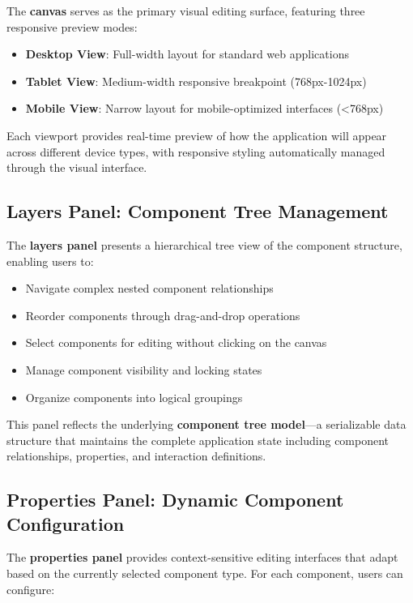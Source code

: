 \documentclass[oneside,11pt]{book}
\begin{document}
The \textbf{canvas} serves as the primary visual editing surface, featuring three responsive preview modes:

\begin{itemize}
    \item \textbf{Desktop View}: Full-width layout for standard web applications
    \item \textbf{Tablet View}: Medium-width responsive breakpoint (768px-1024px)
    \item \textbf{Mobile View}: Narrow layout for mobile-optimized interfaces (<768px)
\end{itemize}

Each viewport provides real-time preview of how the application will appear across different device types, with responsive styling automatically managed through the visual interface.

\subsection{Layers Panel: Component Tree Management}

The \textbf{layers panel} presents a hierarchical tree view of the component structure, enabling users to:

\begin{itemize}
    \item Navigate complex nested component relationships
    \item Reorder components through drag-and-drop operations
    \item Select components for editing without clicking on the canvas
    \item Manage component visibility and locking states
    \item Organize components into logical groupings
\end{itemize}

This panel reflects the underlying \textbf{component tree model}—a serializable data structure that maintains the complete application state including component relationships, properties, and interaction definitions.

\newpage
\subsection{Properties Panel: Dynamic Component Configuration}

The \textbf{properties panel} provides context-sensitive editing interfaces that adapt based on the currently selected component type. For each component, users can configure:
\end{document}
